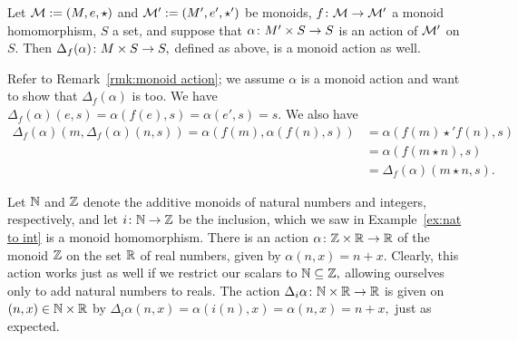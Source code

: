 \documentclass[CT4S-EN-RU]{subfiles}
\begin{document}
\begin{blockRUS}
\end{blockRUS}

\begin{propositionENG}\label{prop:restriction of scalars}
Let $\mathcal{M}:=(M,e,\star)$ and $\mathcal{M}':=(M',e',\star')$ be monoids, $f\colon\mathcal{M}\rightarrow\mathcal{M}'$ a monoid homomorphism, $S$ a set, and suppose that $\alpha\colon M'\times S\rightarrow S$ is an action of $\mathcal{M}'$ on $S.$ Then $\Delta_f(\alpha)\colon M\times S\rightarrow S,$ defined as above, is a monoid action as well.
\end{propositionENG}

\begin{propositionRUS}\label{prop:restriction of scalars}
\end{propositionRUS}

\begin{proofENG}
Refer to Remark~\ref{rmk:monoid action}; we assume $\alpha$ is a monoid action and want to show that $\Delta_f(\alpha)$ is too. We have $\Delta_f(\alpha)(e,s)=\alpha(f(e),s)=\alpha(e',s)=s.$ We also have
\begin{align*}
\Delta_f(\alpha)(m,\Delta_f(\alpha)(n,s))=\alpha(f(m),\alpha(f(n),s))&=\alpha(f(m)\star' f(n),s)\\
&=\alpha(f(m\star n),s)\\
&=\Delta_f(\alpha)(m\star n,s).
\end{align*}
\end{proofENG}

\begin{proofRUS}
\end{proofRUS}

\begin{exampleENG}
Let ${\mathbb N}$ and ${\mathbb Z}$ denote the additive monoids of natural numbers and integers, respectively, and let $i\colon{\mathbb N}\rightarrow{\mathbb Z}$ be the inclusion, which we saw in Example~\ref{ex:nat to int} is a monoid homomorphism. There is an action $\alpha\colon{\mathbb Z}\times{\mathbb R}\rightarrow{\mathbb R}$ of the monoid ${\mathbb Z}$ on the set ${\mathbb R}$ of real numbers, given by $\alpha(n,x)=n+x.$ Clearly, this action works just as well if we restrict our scalars to ${\mathbb N}\subseteq{\mathbb Z},$ allowing ourselves only to add natural numbers to reals. The action $\Delta_i\alpha\colon{\mathbb N}\times{\mathbb R}\rightarrow{\mathbb R}$ is given on $(n,x)\in{\mathbb N}\times{\mathbb R}$ by $\Delta_i\alpha(n,x)=\alpha(i(n),x)=\alpha(n,x)=n+x,$ just as expected.
\end{exampleENG}

\begin{exampleRUS}
\end{exampleRUS}
\end{document}
